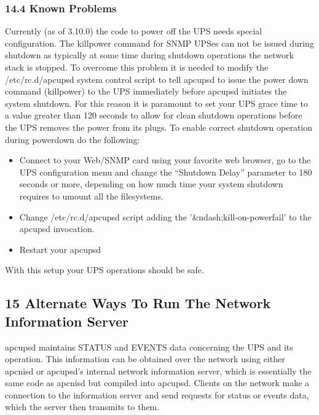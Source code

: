 \label{Known-Problems}

\subsubsection*{14.4 Known Problems}

Currently (as of 3.10.0) the code to power off the UPS needs special
configuration. The killpower command for SNMP UPSes can not be issued during
shutdown as typically at some time during shutdown operations the network
stack is stopped. To overcome this problem it is needed to modify the
/etc/rc.d/apcupsd system control script to tell apcupsd to issue the power
down command (killpower) to the UPS immediately before apcupsd initiates the
system shutdown. For this reason it is paramount to set your UPS grace time to
a value greater than 120 seconds to allow for clean shutdown operations before
the UPS removes the power from its plugs. To enable correct shutdown operation
during powerdown do the following:  

\begin{itemize}
\item Connect to your Web/SNMP card using your favorite web browser, go to the
UPS configuration menu and change the ``Shutdown Delay'' parameter to 180
seconds or more, depending on how much time your system shutdown requires to
umount all the filesystems.  
\item Change /etc/rc.d/apcupsd script adding the '\&ndash;kill-on-powerfail'
to the apcupsd invocation.  
\item Restart your apcupsd 
\end{itemize}

With this setup your UPS operations should be safe. 

\label{Alternate-Ways-To-Run-The-Network-Information-Server}

\subsection*{15 Alternate Ways To Run The Network Information Server}

\label{index-NIS-alternate-was-of-running-165}
apcupsd maintains STATUS and EVENTS data concerning the UPS and its operation.
This information can be obtained over the network using either apcnisd or
apcupsd's internal network information server, which is essentially the same
code as apcnisd but compiled into apcupsd. Clients on the network make a
connection to the information server and send requests for status or events
data, which the server then transmits to them.  

